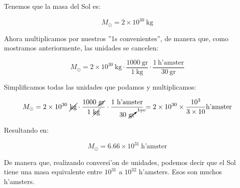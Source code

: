\documentclass{article}
\begin{document}
Tenemos que la masa del Sol es: 

\begin{equation*}
M_\odot = 2 \times 10^{30} \ \text{kg}
\end{equation*}

Ahora multiplicamos por nuestros ''1s convenientes'', de manera que, como mostramos anteriormente, las unidades se cancelen:

\begin{equation*}
M_\odot = 2 \times 10^{30} \ \text{kg} \cdot \frac{1000 \ \text{gr}}{1 \ \text{kg}} \cdot \frac{1 \ \text{h'amster}}{30 \ \text{gr}}
\end{equation*}

Simplificamos todas las unidades que podamos y multiplicamos:

\begin{equation*}
M_\odot = 2 \times 10^{30} \ \cancel{\text{kg}} \cdot \frac{1000 \ \cancel{\text{gr}}}{1 \ \cancel{\text{kg}}} \cdot \frac{1 \ \text{h'amster}}{30 \ \cancelto{\text{bye}}{\text{gr}}} = 2 \times 10^{30} \times \frac{10^3}{3 \times 10} \text{h'amster}
\end{equation*}

Resultando en:

\begin{equation*}
M_\odot = 6.66 \times 10^{31} \ \text{h'amster} 
\end{equation*}

De manera que, realizando conversi'on de unidades, podemos decir que el Sol tiene una masa equivalente entre $10^{31}$ a $10^{32}$ h'amsters. Esos son muchos h'amsters.
\end{document}
